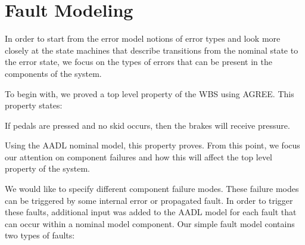 \section{Fault Modeling}

In order to start from the error model notions of error types and look more closely at the state machines that describe transitions from the nominal state to the error state, we focus on the types of errors that can be present in the components of the system. 

To begin with, we proved a top level property of the WBS using AGREE. This property states: \\

\begin{tt}
If pedals are pressed and no skid occurs, then the brakes will receive pressure. \\
\end{tt}

Using the AADL nominal model, this property proves. From this point, we focus our attention on component failures and how this will affect the top level property of the system. 

We would like to specify different component failure modes. These failure modes can be triggered by some internal error or propagated fault. In order to trigger these faults, additional input was added to the AADL model for each fault that can occur within a nominal model component. Our simple fault model contains two types of faults:


